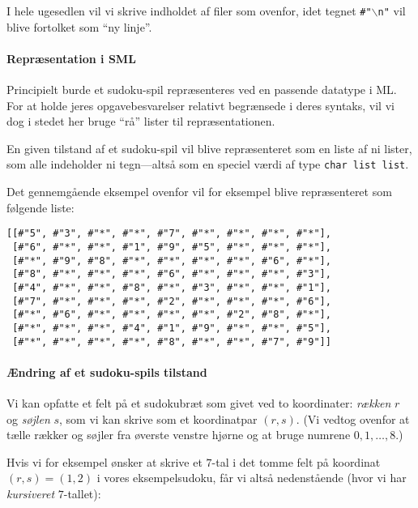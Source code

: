 \documentclass[a4paper]{article}
\begin{document}
I hele ugesedlen vil vi skrive indholdet af filer som ovenfor,
idet tegnet \texttt{\#"$\backslash$n"} vil blive fortolket som ``ny linje''.

\paragraph{Repr{\ae}sentation i SML}

Principielt burde et sudoku-spil repr{\ae}senteres ved en passende datatype i ML.
For at holde jeres opgavebesvarelser relativt begr{\ae}nsede i deres syntaks,
vil vi dog i stedet her bruge ``r{\aa}'' lister til repr{\ae}sentationen.

En given tilstand af et sudoku-spil vil blive repr{\ae}senteret
som en liste af ni lister, som alle indeholder ni tegn---alts{\aa}
som en speciel v{\ae}rdi af type \texttt{char list list}.

\newpage
Det gennemg{\aa}ende eksempel ovenfor vil for eksempel
blive repr{\ae}senteret som f{\o}lgende liste:
\begin{center}
{\small
\begin{verbatim}
[[#"5", #"3", #"*", #"*", #"7", #"*", #"*", #"*", #"*"],
 [#"6", #"*", #"*", #"1", #"9", #"5", #"*", #"*", #"*"],
 [#"*", #"9", #"8", #"*", #"*", #"*", #"*", #"6", #"*"],
 [#"8", #"*", #"*", #"*", #"6", #"*", #"*", #"*", #"3"],
 [#"4", #"*", #"*", #"8", #"*", #"3", #"*", #"*", #"1"],
 [#"7", #"*", #"*", #"*", #"2", #"*", #"*", #"*", #"6"],
 [#"*", #"6", #"*", #"*", #"*", #"*", #"2", #"8", #"*"],
 [#"*", #"*", #"*", #"4", #"1", #"9", #"*", #"*", #"5"],
 [#"*", #"*", #"*", #"*", #"8", #"*", #"*", #"7", #"9"]]
\end{verbatim}
}
\end{center}

\paragraph{{\AE}ndring af et sudoku-spils tilstand}

Vi kan opfatte et felt p{\aa} et sudokubr{\ae}t som givet ved to koordinater:
\emph{r{\ae}kken} $r$ og \emph{s{\o}jlen} $s$, som vi kan skrive som et koordinatpar
$(r,s)$. (Vi vedtog ovenfor at t{\ae}lle r{\ae}kker og s{\o}jler fra {\o}verste venstre hj{\o}rne
og at bruge numrene $0, 1,\ldots, 8$.)

Hvis vi for eksempel {\o}nsker at skrive et $7$-tal i
det tomme felt p{\aa} koordinat $(r,s) = (1,2)$ i vores eksempelsudoku,
f{\aa}r vi alts{\aa} nedenst{\aa}ende (hvor vi har {\it kursiveret} $7$-tallet):
\end{document}
